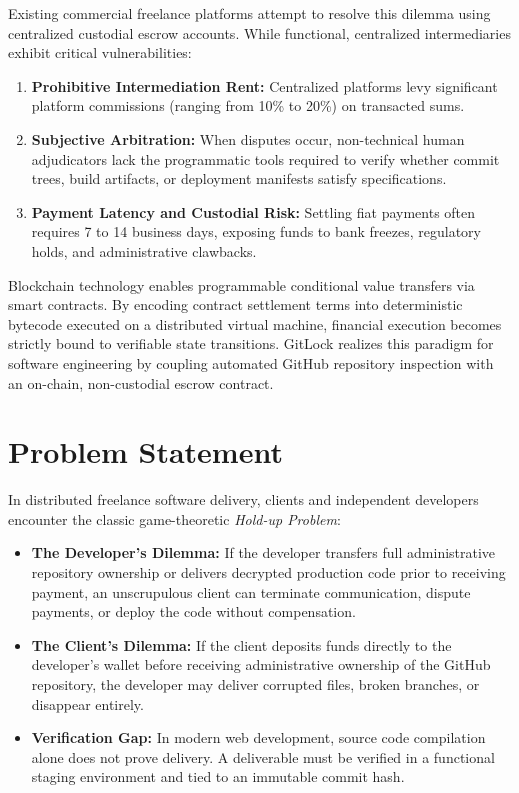 \documentclass[11pt,a4paper]{article}
\begin{document}
Existing commercial freelance platforms attempt to resolve this dilemma using centralized custodial escrow accounts. While functional, centralized intermediaries exhibit critical vulnerabilities:
\begin{enumerate}[noitemsep]
    \item \textbf{Prohibitive Intermediation Rent:} Centralized platforms levy significant platform commissions (ranging from 10\% to 20\%) on transacted sums.
    \item \textbf{Subjective Arbitration:} When disputes occur, non-technical human adjudicators lack the programmatic tools required to verify whether commit trees, build artifacts, or deployment manifests satisfy specifications.
    \item \textbf{Payment Latency and Custodial Risk:} Settling fiat payments often requires 7 to 14 business days, exposing funds to bank freezes, regulatory holds, and administrative clawbacks.
\end{enumerate}

Blockchain technology enables programmable conditional value transfers via smart contracts. By encoding contract settlement terms into deterministic bytecode executed on a distributed virtual machine, financial execution becomes strictly bound to verifiable state transitions. GitLock realizes this paradigm for software engineering by coupling automated GitHub repository inspection with an on-chain, non-custodial escrow contract.

\section{Problem Statement}
In distributed freelance software delivery, clients and independent developers encounter the classic game-theoretic \textit{Hold-up Problem}:
\begin{itemize}[noitemsep]
    \item \textbf{The Developer's Dilemma:} If the developer transfers full administrative repository ownership or delivers decrypted production code prior to receiving payment, an unscrupulous client can terminate communication, dispute payments, or deploy the code without compensation.
    \item \textbf{The Client's Dilemma:} If the client deposits funds directly to the developer's wallet before receiving administrative ownership of the GitHub repository, the developer may deliver corrupted files, broken branches, or disappear entirely.
    \item \textbf{Verification Gap:} In modern web development, source code compilation alone does not prove delivery. A deliverable must be verified in a functional staging environment and tied to an immutable commit hash.
\end{itemize}
\end{document}
